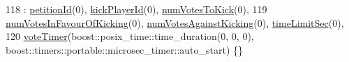 \begin{DoxyCode}
118         : \hyperlink{struct_vote_kick_data_a8deeb29aef91634e9082ca4f79780aa9}{petitionId}(0), \hyperlink{struct_vote_kick_data_a6086ee81bbafdd51a66dfcbc33e74ea2}{kickPlayerId}(0), \hyperlink{struct_vote_kick_data_aa0004f4d5672181658012cd3a92d4a8f}{numVotesToKick}(0),
119           \hyperlink{struct_vote_kick_data_ab5832617a09a60929e6eff903f15d981}{numVotesInFavourOfKicking}(0), 
      \hyperlink{struct_vote_kick_data_aec0801b812692d84c9abce891e8fefcd}{numVotesAgainstKicking}(0), \hyperlink{struct_vote_kick_data_a79e16bf0cf655c6de32eb21beecaf3bf}{timeLimitSec}(0),
120           \hyperlink{struct_vote_kick_data_a0a4074bb3ceb4760b27403e1fd67c45d}{voteTimer}(boost::posix\_time::time\_duration(0, 0, 0), 
      boost::timers::portable::microsec\_timer::auto\_start) \{\}
\end{DoxyCode}


